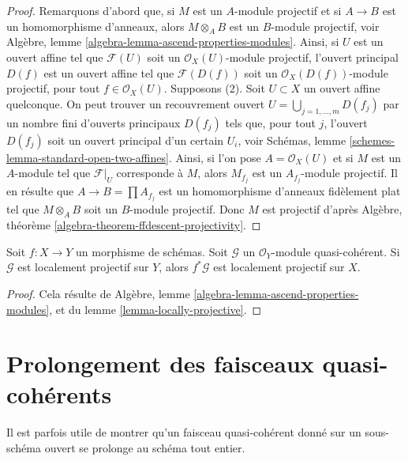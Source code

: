 \begin{proof}
Remarquons d'abord que, si $M$ est un $A$-module projectif et si $A \to B$ est un
homomorphisme d'anneaux, alors $M \otimes_A B$ est un $B$-module projectif, voir
Algèbre, lemme \ref{algebra-lemma-ascend-properties-modules}.
Ainsi, si $U$ est un ouvert affine tel que $\mathcal{F}(U)$ soit un
$\mathcal{O}_X(U)$-module projectif, l'ouvert principal $D(f)$ est un
ouvert affine tel que $\mathcal{F}(D(f))$ soit un
$\mathcal{O}_X(D(f))$-module projectif, pour tout $f \in \mathcal{O}_X(U)$.
Supposons (2). Soit $U \subset X$ un ouvert affine quelconque.
On peut trouver un recouvrement ouvert $U = \bigcup_{j = 1, \ldots, m} D(f_j)$
par un nombre fini d'ouverts principaux $D(f_j)$ tels que, pour tout
$j$, l'ouvert $D(f_j)$ soit un ouvert principal d'un certain $U_i$, voir
Schémas, lemme \ref{schemes-lemma-standard-open-two-affines}.
Ainsi, si l'on pose $A = \mathcal{O}_X(U)$ et si $M$ est un $A$-module
tel que $\mathcal{F}|_U$ corresponde à $M$, alors
$M_{f_j}$ est un $A_{f_j}$-module projectif. Il en résulte que
$A \to B = \prod A_{f_j}$ est un homomorphisme d'anneaux fidèlement plat
tel que $M \otimes_A B$ soit un $B$-module projectif.
Donc $M$ est projectif d'après
Algèbre, théorème \ref{algebra-theorem-ffdescent-projectivity}.
\end{proof}

\begin{lemma}
\label{lemma-locally-projective-pullback}
Soit $f : X \to Y$ un morphisme de schémas.
Soit $\mathcal{G}$ un $\mathcal{O}_Y$-module quasi-cohérent.
Si $\mathcal{G}$ est localement projectif sur $Y$, alors $f^*\mathcal{G}$
est localement projectif sur $X$.
\end{lemma}

\begin{proof}
Cela résulte de
Algèbre, lemme \ref{algebra-lemma-ascend-properties-modules},
et du lemme \ref{lemma-locally-projective}.
\end{proof}

\section{Prolongement des faisceaux quasi-cohérents}
\label{section-extending-quasi-coherent-sheaves}

\noindent
Il est parfois utile de montrer qu'un faisceau quasi-cohérent donné
sur un sous-schéma ouvert se prolonge au schéma tout entier.

